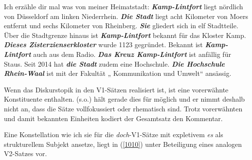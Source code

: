 \begin{exe}
	\ex\label{1009} 

	Ich erzähle dir mal was von meiner Heimatstadt: \textbf{\textit{Kamp-Lintfort}} liegt nördlich von Düsseldorf am linken Niederrhein. 						\textbf{\textit{Die Stadt}} liegt acht Kilometer von Moers entfernt und sechs Kilometer von Rheinberg. \textbf{\textit{Sie}} gliedert sich in elf 			Stadtteile. Über die Stadtgrenze hinaus ist \textbf{\textit{Kamp-Lintfort}} bekannt für das Kloster Kamp. \textbf{\textit{Dieses Zisterzienserkloster}} 	wurde 1123 gegründet. Bekannt ist \textbf{\textit{Kamp-Lintfort}} auch aus dem Radio. \textbf{\textit{Das Kreuz Kamp-Lintfort}} ist anfällig für 			Staus. Seit 2014 hat \textbf{\textit{die Stadt}} zudem eine Hochschule. \textbf{\textit{Die Hochschule Rhein-Waal}} ist mit der Fakultät „				Kommunikation und Umwelt“ ansässig.
\end{exe}
Wenn das Diskurstopik in den V1-Sätzen realisiert ist, ist eine vorerwähnte Konstituente enthalten. \citet{Oennerfors1997} (s.o.) hält gerade dies für möglich und er nimmt deshalb nicht an, dass die Sätze vollfokussiert oder rhematisch sind. Trotz vorerwähnten und damit bekannten Einheiten kodiert der Gesamtsatz den Kommentar.\largerpage 

Eine Konstellation wie ich sie für die \textit{doch}-V1-Sätze mit expletivem \textit{es} als strukturellem Subjekt ansetze, liegt in (\ref{1010}) unter Beteiligung eines analogen V2-Satzes vor.

